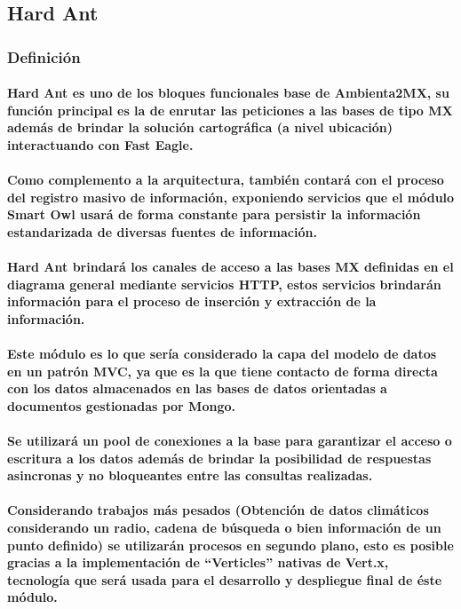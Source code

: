   \subsection{Hard Ant}
    \subsubsection{Definición}
      \paragraph{Hard Ant es uno de los bloques funcionales base de Ambienta2MX, su función principal es la de enrutar las peticiones a las bases de tipo MX además de brindar la solución cartográfica (a nivel ubicación) interactuando con Fast Eagle.}
      \paragraph{Como complemento a la arquitectura, también contará con el proceso del registro masivo de información, exponiendo servicios que el módulo Smart Owl usará de forma constante para persistir la información estandarizada de diversas fuentes de información.}
      \paragraph{Hard Ant brindará los canales de acceso a las bases MX definidas en el diagrama general mediante servicios HTTP, estos servicios brindarán información para el proceso de inserción y extracción de la información. }
      \paragraph{Este módulo es lo que sería considerado la capa del modelo de datos en un patrón MVC, ya que es la que tiene contacto de forma directa con los datos almacenados en las bases de datos orientadas a documentos gestionadas por Mongo.}
      \paragraph{Se utilizará un pool de conexiones a la base para garantizar el acceso o escritura a los datos además de brindar la posibilidad de respuestas asincronas y no bloqueantes entre las consultas realizadas.}
      \paragraph{Considerando trabajos más pesados (Obtención de datos climáticos considerando un radio, cadena de búsqueda o bien información de un punto definido) se utilizarán procesos en segundo plano, esto es posible gracias a la implementación de ``Verticles'' nativas de Vert.x, tecnología que será usada para el desarrollo y despliegue final de éste módulo.}

